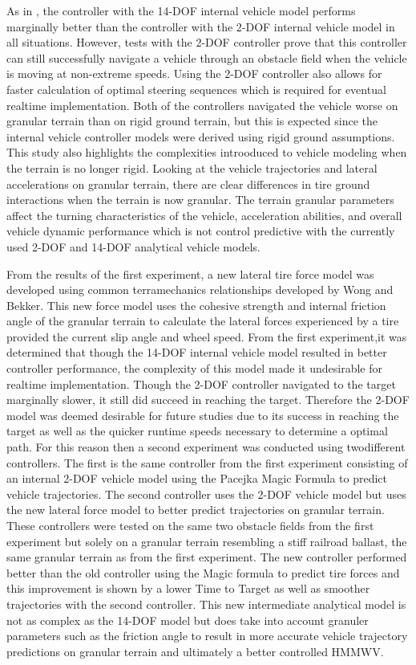 \documentclass[12pt,onecolumn]{report}
\begin{document}
As in \cite{ModelFidelity2016}, the controller with the 14-DOF internal vehicle model performs marginally better than the controller with the 2-DOF internal vehicle model in all situations. However, tests with the 2-DOF controller prove that this controller can still successfully navigate a vehicle through an obstacle field when the vehicle is moving at non-extreme speeds. Using the 2-DOF controller also allows for faster calculation of optimal steering sequences which is required for eventual realtime implementation. Both of the controllers navigated the vehicle worse on granular terrain than on rigid ground terrain, but this is expected since the internal vehicle controller models were derived using rigid ground assumptions. This study also highlights the complexities introoduced to vehicle modeling when the terrain is no longer rigid. Looking at the vehicle trajectories and lateral accelerations on granular terrain, there are clear differences in tire ground interactions when the terrain is now granular. The terrain granular parameters affect the turning characteristics of the vehicle, acceleration abilities, and overall vehicle dynamic performance which is not control predictive with the currently used 2-DOF and 14-DOF analytical vehicle models. 

From the results of the first experiment, a new lateral tire force model was developed using common terramechanics relationships developed by Wong and Bekker. This new force model uses the cohesive strength and internal friction angle of the granular terrain to calculate the lateral forces experienced by a tire provided the current slip angle and wheel speed. From the first experiment,it was determined that though the 14-DOF internal vehicle model resulted in better controller performance, the complexity of this model made it undesirable for realtime implementation. Though the 2-DOF controller navigated to the target marginally slower, it still did succeed in reaching the target. Therefore the 2-DOF model was deemed desirable for future studies due to its success in reaching the target as well as the quicker runtime speeds necessary to determine a optimal path. For this reason then a second experiment was conducted using twodifferent controllers. The first is the same controller from the first experiment consisting of an internal 2-DOF vehicle model using the Pacejka Magic Formula to predict vehicle trajectories. The second controller uses the 2-DOF vehicle model but uses the new lateral force model to better predict trajectories on granular terrain. These controllers were tested on the same two obstacle fields from the first experiment but solely on a granular terrain resembling a stiff railroad ballast, the same granular terrain as from the first experiment. The new controller performed better than the old controller using the Magic formula to predict tire forces and this improvement is shown by a lower Time to Target as well as smoother trajectories with the second controller. This new intermediate analytical model is not as complex as the 14-DOF model but does take into account granuler parameters such as the friction angle to result in more accurate vehicle trajectory predictions on granular terrain and ultimately a better controlled HMMWV. 
\end{document}
